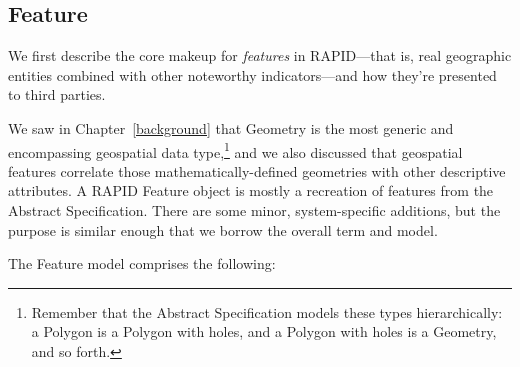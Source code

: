 \subsection{Feature}
We first describe the core makeup for \textit{features} in RAPID---that is, real geographic entities combined with other noteworthy indicators---and how they're presented to third parties.

We saw in Chapter~\ref{background} that Geometry is the most generic and encompassing geospatial data type,\footnote{Remember that the Abstract Specification models these types hierarchically: a Polygon is a Polygon with holes, and a Polygon with holes is a Geometry, and so forth.} and we also discussed that geospatial features correlate those mathematically-defined geometries with other descriptive attributes. A RAPID Feature object is mostly a recreation of features from the Abstract Specification. There are some minor, system-specific additions, but the purpose is similar enough that we borrow the overall term and model.

The Feature model comprises the following:

